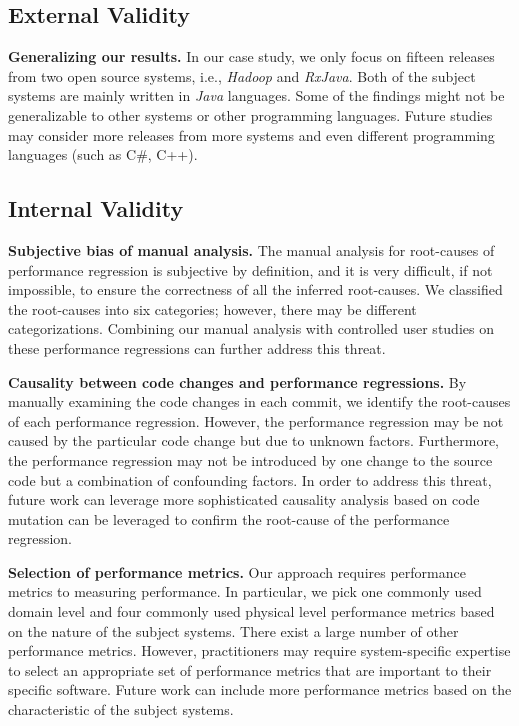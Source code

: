 \subsection{External Validity}

\textbf{Generalizing our results. }In our case study, we only focus on fifteen releases from two open source systems, i.e., \emph{Hadoop} and \emph{RxJava}. Both of the subject systems are mainly written in \emph{Java} languages. Some of the findings might not be generalizable to other systems or other programming languages. Future studies may consider more releases from more systems and even different programming languages (such as C\#, C++). 


\subsection{Internal Validity}

\textbf{Subjective bias of manual analysis.} The manual analysis for root-causes of performance regression is subjective by definition, and it is very difficult, if not impossible, to ensure the correctness of all the inferred
root-causes. We classified the root-causes into six categories; however, there may be different categorizations. Combining our manual analysis with controlled user studies on these performance regressions can further address this threat.


\textbf{Causality between code changes and performance regressions. }By manually examining the code changes in each commit, we identify the root-causes of each performance regression. However, the performance regression may be not caused by the particular code change but due to unknown factors. Furthermore, the performance regression may not be introduced by one change to the source code but a combination of confounding factors. In order to address this threat, future work can leverage more sophisticated causality analysis based on code mutation can be leveraged to confirm the root-cause of the performance regression. 


\textbf{Selection of performance metrics.} Our approach requires performance metrics to measuring performance. In particular, we pick one commonly used domain level and four commonly used physical level performance metrics based on the nature of the subject systems. There exist a large number of other performance metrics. However, practitioners may require system-specific expertise to select an appropriate set of performance metrics that are important to their specific software. Future work can include more performance metrics based on the characteristic of the subject systems. 



